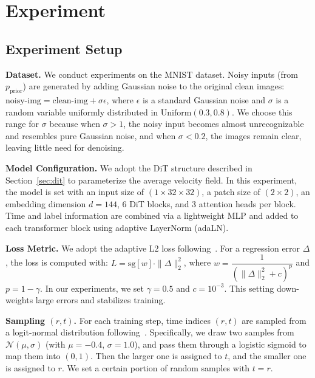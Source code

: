 \section{Experiment}
\subsection{Experiment Setup}

{
\setlength{\parindent}{0pt}

\textbf{Dataset.} We conduct experiments on the MNIST dataset. Noisy inputs (from $p_\text{prior}$) are generated by adding Gaussian noise to the original clean images: $\text{noisy-img} = \text{clean-img} + \sigma \epsilon$, where $\epsilon$ is a standard Gaussian noise and $\sigma$ is a random variable uniformly distributed in $\text{Uniform}(0.3, 0.8)$. We choose this range for $\sigma$ because when $\sigma > 1$, the noisy input becomes almost unrecognizable and resembles pure Gaussian noise, and when $\sigma < 0.2$, the images remain clear, leaving little need for denoising.

\vspace{1em}

\textbf{Model Configuration.}
We adopt the DiT structure described in Section~\ref{sec:dit} to parameterize the average velocity field. In this experiment, the model is set with an input size of $(1 \times 32 \times32)$, a patch size of $(2 \times 2)$, an embedding dimension $d=144$, $6$ DiT blocks, and $3$ attention heads per block. Time and label information are combined via a lightweight MLP and added to each transformer block using adaptive LayerNorm (adaLN).

\vspace{1em}

\textbf{Loss Metric.}
We adopt the adaptive L2 loss following~\cite{meanflow}. For a regression error $\Delta$, the loss is computed with:
$L = \text{sg}[w] \cdot \|\Delta\|_2^2$, where $w = \dfrac{1}{(\|\Delta\|_2^2 + c)^p}$ and $p = 1-\gamma$. In our experiments, we set $\gamma=0.5$ and $c=10^{-3}$. This setting down-weights large errors and stabilizes training.

\vspace{1em}

\textbf{Sampling $(r, t)$.}
For each training step, time indices $(r, t)$ are sampled from a logit-normal distribution following~\cite{meanflow}. Specifically, we draw two samples from $\mathcal{N}(\mu,\sigma)$ (with $\mu=-0.4$, $\sigma=1.0$), and pass them through a logistic sigmoid to map them into $(0,1)$. Then the larger one is assigned to $t$, and the smaller one is assigned to $r$. We set a certain portion of random samples with $t = r$.

}

